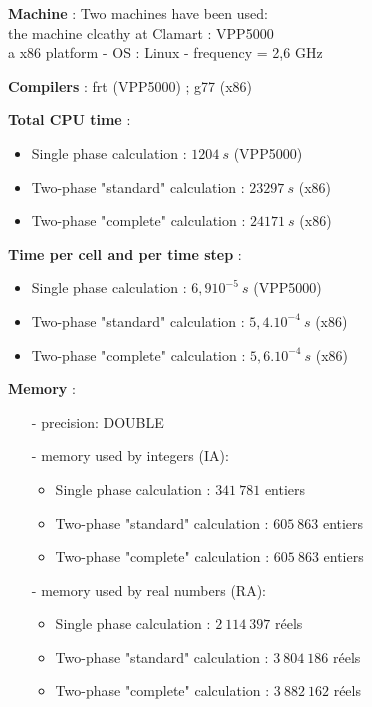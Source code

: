 \documentclass[a4paper,twoside,12pt]{article}
\begin{document}
\begin{description}

   \item[]\textbf{Machine} : Two machines have been used: \\
         the machine clcathy at Clamart : VPP5000 \\
         a x86 platform - OS : Linux - frequency = 2,6 GHz
   \item[]\textbf{Compilers} : frt (VPP5000) ; g77 (x86)
   \item[]\textbf{Total CPU time} :
         \begin{itemize}
            \item Single phase calculation :  $1204~s$ (VPP5000)
            \item Two-phase "standard" calculation :  $23297~s$ (x86)
            \item Two-phase "complete" calculation :  $24171~s$ (x86)
         \end{itemize}
   \item[]\textbf{Time per cell and per time step} :
         \begin{itemize}
            \item Single phase calculation : $6,9 10^{-5}~s$  (VPP5000)
            \item Two-phase "standard" calculation :  $5,4.10^{-4}~s$ (x86)
            \item Two-phase "complete" calculation :  $5,6.10^{-4}~s$ (x86)
         \end{itemize}

   \item[]\textbf{Memory} :
         \begin{itemize}
            \item[-] precision: DOUBLE
            \item[-] memory used by integers (IA):
                  \begin{itemize}
                     \item Single phase calculation : $341~781$ entiers
                     \item Two-phase "standard" calculation :  $605~863$ entiers
                     \item Two-phase "complete" calculation :  $605~863$  entiers
                  \end{itemize}
            \item[-] memory used by real numbers (RA):
                  \begin{itemize}
                     \item Single phase calculation : $2~114~397$ r\'eels
                     \item Two-phase "standard" calculation :  $3~804~186$ r\'eels
                     \item Two-phase "complete" calculation :  $3~882~162$ r\'eels
                  \end{itemize}
         \end{itemize}

\end{description}
\end{document}
